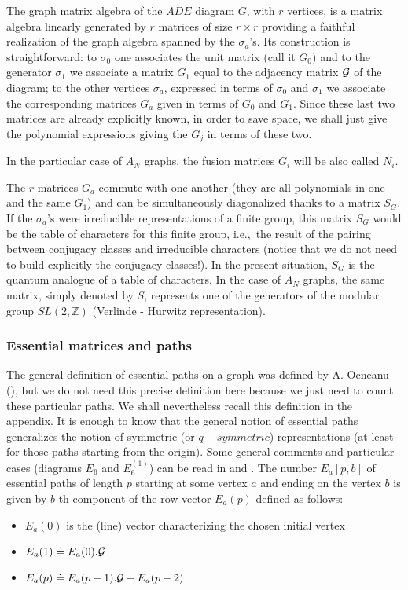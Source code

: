 \documentclass[a4paper,11pt]{article}
\def\ie{{\rm i.e.,\/}\ }
\newcommand{\ZZ}{\mathbb{Z}}
\begin{document}
The  graph matrix algebra of the $ADE$ diagram $G$, with $r$ vertices,
       is a matrix algebra linearly generated by $r$ matrices of
size $r\times r$  providing a
faithful realization of the  graph algebra spanned by the $\sigma_{a}$'s. Its
construction is straightforward: to $\sigma_{0}$ one associates the
unit matrix (call it $G_0$) and to the generator  $\sigma_{1}$ we associate a
matrix $G_1$ equal to the adjacency matrix ${\cal G}$ of the diagram;
to the other vertices $\sigma_a$, expressed in terms of
$\sigma_0$ and $\sigma_1$ we associate the corresponding matrices $G_a$
given in terms of $G_0$ and $G_1$.
Since these last two matrices are already explicitly known, in order
to save space,
we shall just give the
polynomial expressions giving the $G_j$ in terms of these two.

In the particular case of $A_N$ graphs, the fusion matrices $G_{i}$ will
be also called $N_i$.

The $r$ matrices $G_a$ commute with one another (they are all polynomials in one and 
the same $G_1$) and can be simultaneously
diagonalized thanks to a matrix $S_{G}$.
If the $\sigma_a$'s were irreducible representations of a finite group,
this matrix $S_{G}$ would be the table of characters for this finite
group, \ie the
result of the pairing between conjugacy classes and irreducible characters
(notice that we do not need
to build explicitly the conjugacy classes!). In the present situation,
$S_{G}$ is the quantum analogue of a table of characters.
In the case of $A_{N}$ graphs, the same matrix, simply denoted by
$S$, represents one of the
generators of the
modular group $SL(2,\ZZ)$ (Verlinde - Hurwitz representation).

\subsubsection{Essential matrices and paths}
The general definition of essential paths on a graph was defined by
A. Ocneanu (\cite{Ocneanu:paths}), but we do not need this precise
definition here because we just need
to count these particular paths. We shall nevertheless recall this
definition in the appendix. It is enough to know that
the general notion of essential paths generalizes the notion of symmetric
(or $q-symmetric$) representations (at least for those paths starting
from the origin). Some general comments and
particular cases (diagrams $E_6$ and
$E_6^{(1)}$) can be read in \cite{Coque:Karpacz} and \cite{Coque:qtetra}.
The number $E_a[p,b]$ of essential paths of length $p$ starting at some
vertex $a$ and ending on the vertex $b$ is given by $b$-th component of the
row vector $E_a(p)$ defined as follows:
\begin{itemize}
\item $E_a(0)$ is the  (line) vector characterizing the chosen initial
vertex
\item $E_a(1) \doteq E_a(0).{\cal G}$
\item $E_a (p) \doteq  E_a(p-1).{\cal G} - E_a (p-2)$
\end{itemize}
\end{document}
